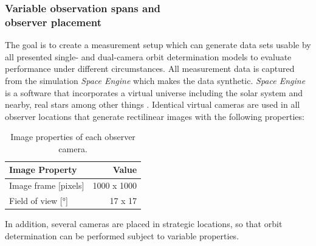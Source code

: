 \documentclass[10pt,a4paper]{article}
\begin{document}
	\subsubsection{Variable observation spans and \\ observer placement}\label{sec:observation_setup}
	The goal is to create a measurement setup which can generate data sets usable by all presented single- and dual-camera orbit determination models to evaluate performance under different circumstances. All measurement data is captured from the  simulation \emph{Space Engine} which makes the data synthetic. \emph{Space Engine} is a software that incorporates a virtual universe including the solar system and nearby, real stars among other things \cite{space_engine}.\newline
	Identical virtual cameras are used in all observer locations that generate rectilinear images with the following properties:
	\begin{table}[H]
		\centering
		\begin{tabular}{l|r}
			Image Property & Value \\\hline
			Image frame [pixels] & 1000 x 1000 \\
			Field of view [°] & 17 x 17
		\end{tabular}
		\caption{\label{tab:sun_cam}Image properties of each observer camera.}
	\end{table}
	\noindent
	In addition, several cameras are placed in strategic locations, so that  orbit determination can be performed subject to variable properties.
\end{document}
